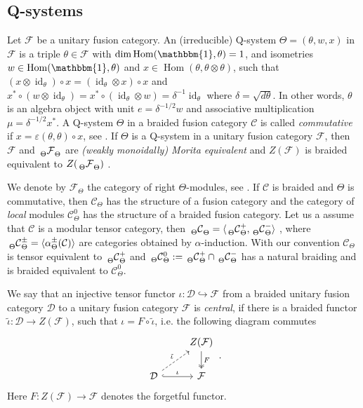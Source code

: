 \documentclass[twoside,11pt,reqno]{amsart}
\makeatletter
\theoremstyle{definition}
\theoremstyle{remark}
\newcommand{\cF}{\mathcal{F}}
\newcommand{\cD}{\mathcal{D}}
\newcommand{\cC}{\mathcal{C}}
\DeclareMathOperator{\Hom}{Hom}
\DeclareMathOperator{\id}{id}
\DeclareRobustCommand{\ie}{i.e.\@\xspace}
\newcommand{\tu}{\mathbbm{1}} %
\newcommand{\bim}[4][]{{}\prescript{\vphantom{#1}}{#2}{#3}^{#1}_{#4}}
\newcommand{\myemph}[1]{\emph{#1}}
\makeatother
\begin{document}
\subsection{Q-systems}
\label{ssec:QSystems}

Let $\cF$ be a unitary fusion category. 
An (irreducible) Q-system $\Theta=(\theta,w,x)$ in $\cF$ is a triple
$\theta\in\cF$ with $\dim\Hom(\tu,\theta)=1$, and isometries
$w\in\Hom(\tu,\theta)$ and $x\in\Hom(\theta,\theta\otimes \theta)$, such that
$(x\otimes \id_\theta)\circ x=(\id_\theta\otimes x)\circ x$ and 
$x^\ast \circ (w\otimes \id_\theta) = x^\ast\circ (\id_\theta\otimes w)
  =\delta^{-1} \id_\theta$ where $\delta=\sqrt{d\theta}$. 
In other words, $\theta$ is an algebra object with unit $e=\delta^{-1/2} w$ and
associative multiplication $\mu=\delta^{-1/2} x^\ast$.
A Q-system $\Theta$ in a braided fusion category $\cC$ is called 
\myemph{commutative} if $x=\varepsilon(\theta,\theta)\circ x$, see
\cite{BiKaLoRe2014-2,BiKaLo2014}.
If $\Theta$ is a Q-system in a unitary fusion category $\cF$, then
$\cF$ and $\bim \Theta\cF\Theta$ are 
\myemph{(weakly monoidally) Morita equivalent} and 
$Z(\cF)$ is braided equivalent to 
$Z(\bim\Theta\cF\Theta)$ \cite{Mg2003,Mg2003II}.


We denote by $\cF_\Theta$ the category of right $\Theta$-modules, 
see \cite{BiKaLoRe2014-2,BiKaLo2014}.
If $\cC$ is braided and $\Theta$ is commutative, then $\cC_\Theta$ has the 
structure of a fusion category and the category of \myemph{local} modules
$\cC_\Theta^0$ has the structure of a braided fusion category.
Let us a assume that $\cC$ is a modular tensor category, then 
$\bim \Theta \cC\Theta=\langle \bim[+] \Theta \cC\Theta, 
\bim[-] \Theta \cC\Theta\rangle$  \cite[Theorem 5.10]{BcEvKa1999}, where
$\bim[\pm]\Theta\cC\Theta=\langle\alpha_\Theta^\pm(\cC)\rangle$
are categories obtained by $\alpha$-induction. 
With our convention $\cC_\Theta$ is tensor equivalent to 
$\bim[+]\Theta\cC\Theta$ and
$\bim[0]\Theta \cC\Theta:= 
  \bim[+] \Theta \cC\Theta\cap \bim[-] \Theta \cC\Theta$ has a natural braiding
and is braided equivalent to $\cC_\Theta^0$.

%
%

We say that an injective tensor functor 
$\iota\colon \cD\hookrightarrow\cF$ from a braided
unitary fusion category $\cD$ to a unitary fusion category $\cF$ is 
\myemph{central}, if there is a braided functor 
$\tilde\iota \colon \cD\to Z(\cF)$, such that $\iota=F\circ\tilde\iota$, 
\ie the following diagram commutes
%
$$
\begin{tikzcd}
    & Z(\cF) \arrow[d,"F",two heads]  \\
   \cD\arrow[ru,"\tilde \iota",dashed]\arrow[r,"\iota",hookrightarrow]  
   & \cF 
  \end{tikzcd}\,.
$$
%
Here $F\colon Z(\cF)\to \cF$ denotes the forgetful functor. 
\end{document}
